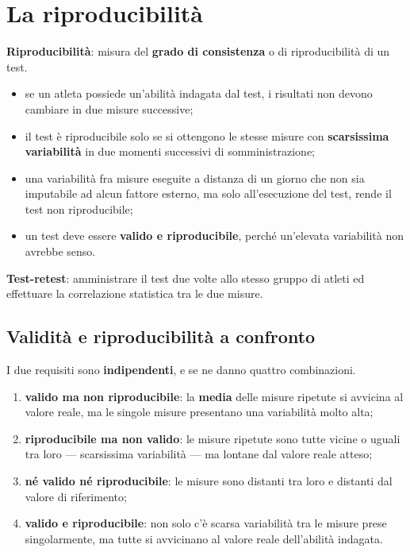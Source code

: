 \section{La riproducibilità}

\textbf{Riproducibilità}: misura del \textbf{grado di consistenza} o di riproducibilità di un test.

\begin{itemize}
  \item se un atleta possiede un'abilità indagata dal test, i risultati non devono cambiare in
    due misure successive;
  \item il test è riproducibile solo se si ottengono le stesse misure con \textbf{scarsissima
    variabilità} in due momenti successivi di somministrazione;
  \item una variabilità fra misure eseguite a distanza di un giorno che non sia imputabile ad
    alcun fattore esterno, ma solo all'esecuzione del test, rende il test non riproducibile;
  \item un test deve essere \textbf{valido e riproducibile}, perché un'elevata variabilità non
    avrebbe senso.
\end{itemize}

\textbf{Test-retest}: amministrare il test due volte allo stesso gruppo di atleti ed effettuare
la correlazione statistica tra le due misure.

\subsection{Validità e riproducibilità a confronto}

I due requisiti sono \textbf{indipendenti}, e se ne danno quattro combinazioni.

\begin{enumerate}
  \item \textbf{valido ma non riproducibile}: la \textbf{media} delle misure ripetute si avvicina
    al valore reale, ma le singole misure presentano una variabilità molto alta;
  \item \textbf{riproducibile ma non valido}: le misure ripetute sono tutte vicine o uguali tra
    loro --- scarsissima variabilità --- ma lontane dal valore reale atteso;
  \item \textbf{né valido né riproducibile}: le misure sono distanti tra loro e distanti dal valore
    di riferimento;
  \item \textbf{valido e riproducibile}: non solo c'è scarsa variabilità tra le misure prese
    singolarmente, ma tutte si avvicinano al valore reale dell'abilità indagata.
\end{enumerate}

